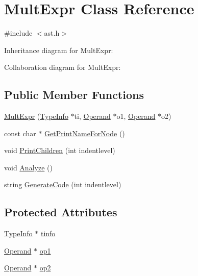 \hypertarget{class_mult_expr}{}\section{Mult\+Expr Class Reference}
\label{class_mult_expr}


{\ttfamily \#include $<$ast.\+h$>$}



Inheritance diagram for Mult\+Expr\+:


Collaboration diagram for Mult\+Expr\+:
\subsection*{Public Member Functions}
\begin{DoxyCompactItemize}
\item 
\hyperlink{class_mult_expr_a9f22ce81d1c6111368ba4a94381a0af0}{Mult\+Expr} (\hyperlink{class_type_info}{Type\+Info} $\ast$ti, \hyperlink{class_operand}{Operand} $\ast$o1, \hyperlink{class_operand}{Operand} $\ast$o2)
\item 
const char $\ast$ \hyperlink{class_mult_expr_af09a0cb0e06bfc24892dee567f48808c}{Get\+Print\+Name\+For\+Node} ()
\item 
void \hyperlink{class_mult_expr_ae87b8f5f11f98d66a6327a110267348d}{Print\+Children} (int indentlevel)
\item 
void \hyperlink{class_mult_expr_accc5d3ee9e4a837eb82c8a51440f69ac}{Analyze} ()
\item 
string \hyperlink{class_mult_expr_a06698bfc99d60d7ce2fde5d7f0addc66}{Generate\+Code} (int indentlevel)
\end{DoxyCompactItemize}
\subsection*{Protected Attributes}
\begin{DoxyCompactItemize}
\item 
\hyperlink{class_type_info}{Type\+Info} $\ast$ \hyperlink{class_mult_expr_ae2bc9b1b3fc5234d5d15411f82e5d882}{tinfo}
\item 
\hyperlink{class_operand}{Operand} $\ast$ \hyperlink{class_mult_expr_aa5ca086a99b10f512002938ec619b0e3}{op1}
\item 
\hyperlink{class_operand}{Operand} $\ast$ \hyperlink{class_mult_expr_a92004aab48eaa8d46b2bbe4caa250c80}{op2}
\end{DoxyCompactItemize}



